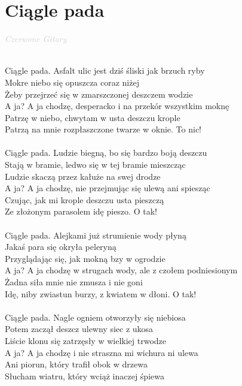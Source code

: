 \documentclass[a5paper, 10pt]{book}
\begin{document}
\section{Ciągle pada}\textcolor{lightgray}{\textit{Czerwone Gitary}}\\~\\
\begin{minipage}[t]{0.8\textwidth}
Ciągle pada. Asfalt ulic jest dziś śliski jak brzuch ryby\\
Mokre niebo się opuszcza coraz niżej\\
Żeby przejrzeć się w zmarszczonej deszczem wodzie\\
A ja? A ja chodzę, desperacko i na przekór wszystkim moknę\\
Patrzę w niebo, chwytam w usta deszczu krople\\
Patrzą na mnie rozpłaszczone twarze w oknie. To nic!\\
\\
\hspace*{3mm}Ciągle pada. Ludzie biegną, bo się bardzo boją deszczu\\
\hspace*{3mm}Stają w bramie, ledwo się w tej bramie mieszcząc\\
\hspace*{3mm}Ludzie skaczą przez kałuże na swej drodze\\
\hspace*{3mm}A ja? A ja chodzę, nie przejmując się ulewą ani spiesząc\\
\hspace*{3mm}Czując, jak mi krople deszczu usta pieszczą\\
\hspace*{3mm}Ze złożonym parasolem idę pieszo. O tak!\\
\\
Ciągle pada. Alejkami już strumienie wody płyną\\
Jakaś para się okryła peleryną\\
Przyglądając się, jak mokną bzy w ogrodzie\\
A ja? A ja chodzę w strugach wody, ale z czołem podniesionym\\
Żadna siła mnie nie zmusza i nie goni\\
Idę, niby zwiastun burzy, z kwiatem w dłoni. O tak!\\
\\
\hspace*{3mm}Ciągle pada. Nagle ogniem otworzyły się niebiosa\\
\hspace*{3mm}Potem zaczął deszcz ulewny siec z ukosa\\
\hspace*{3mm}Liście klonu się zatrzęsły w wielkiej trwodze\\
\hspace*{3mm}A ja? A ja chodzę i nie straszna mi wichura ni ulewa\\
\hspace*{3mm}Ani piorun, który trafił obok w drzewa\\
\hspace*{3mm}Słucham wiatru, który wciąż inaczej śpiewa\\
\end{minipage}
\end{document}
